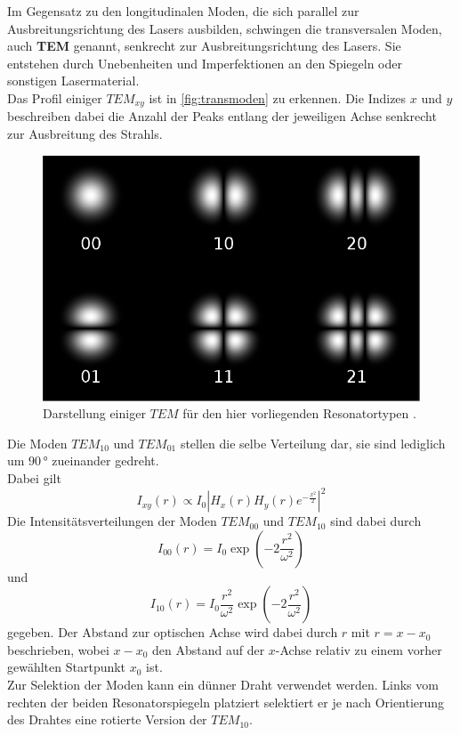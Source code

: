 Im Gegensatz zu den longitudinalen Moden, die sich parallel zur Ausbreitungsrichtung des Lasers ausbilden, schwingen die transversalen Moden, auch \textbf{TEM} genannt, senkrecht zur Ausbreitungsrichtung des Lasers.
Sie entstehen durch Unebenheiten und Imperfektionen an den Spiegeln oder sonstigen Lasermaterial. \\
Das Profil einiger $TEM_{x y}$ ist in \autoref{fig:transmoden} zu erkennen.
Die Indizes $x$ und $y$ beschreiben dabei die Anzahl der Peaks entlang der jeweiligen Achse senkrecht zur Ausbreitung des Strahls.

\begin{figure}[H]
    \centering
    \includegraphics[width=.5\textwidth]{figures/TransversaleModen.pdf}
    \caption{Darstellung einiger $TEM$ für den hier vorliegenden Resonatortypen \cite{transmode}.}
    \label{fig:transmoden}
\end{figure}

Die Moden $TEM_{10}$ und $TEM_{01}$ stellen die selbe Verteilung dar, sie sind lediglich um $90 \,°$ zueinander gedreht. \\
Dabei gilt
\begin{equation*}
    I_{xy} (r) \propto I_0 \left| H_x(r) H_y(r) e^{-\frac{x^2}{2}} \right|^2 
\end{equation*}
Die Intensitätsverteilungen der Moden $TEM_{00}$ und $TEM_{10}$ sind dabei durch
\begin{equation}
    I_{00} (r) = I_0 \exp \left(-2\frac{r^2}{\omega^2} \right)
    \label{eq:int00}
\end{equation}
und
\begin{equation}
    I_{10} (r) = I_0 \frac{r^2}{\omega^2} \exp \left(-2\frac{r^2}{\omega^2}\right)
    \label{eq:int10}
\end{equation}
gegeben.
Der Abstand zur optischen Achse wird dabei durch $r$ mit $r = x - x_0$ beschrieben, wobei $x - x_0$ den Abstand auf der $x$-Achse relativ zu einem vorher gewählten Startpunkt $x_0$ ist. \\

Zur Selektion der Moden kann ein dünner Draht verwendet werden.
Links vom rechten der beiden Resonatorspiegeln platziert selektiert er je nach Orientierung des Drahtes eine rotierte Version der $TEM_{10}$. \\

